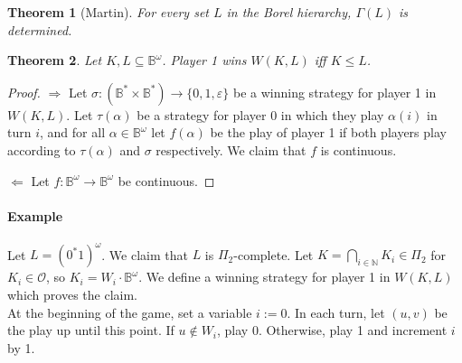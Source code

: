 \documentclass{article}
\newtheorem{theorem}{Theorem}
\begin{document}
\begin{theorem}[Martin]
	For every set $L$ in the Borel hierarchy, $\Gamma(L)$ is determined.
\end{theorem} 

\begin{theorem}
	Let $K, L \subseteq \mathbb{B}^\omega$. Player 1 wins $W(K, L)$ iff $K \leq L$.
\end{theorem}
\begin{proof}
	$\boldsymbol{\Rightarrow}$ Let $\sigma : (\mathbb{B}^* \times \mathbb{B}^*) \rightarrow \{0, 1, \varepsilon\}$ be a winning strategy for player 1 in $W(K, L)$. Let $\tau(\alpha)$ be a strategy for player 0 in which they play $\alpha(i)$ in turn $i$, and for all $\alpha \in \mathbb{B}^\omega$ let $f(\alpha)$ be the play of player 1 if both players play according to $\tau(\alpha)$ and $\sigma$ respectively. We claim that $f$ is continuous. %
	
	$\boldsymbol{\Leftarrow}$ Let $f : \mathbb{B}^\omega \rightarrow \mathbb{B}^\omega$ be continuous. %
\end{proof}

\paragraph{Example} Let $L = (0^*1)^\omega$. We claim that $L$ is $\Pi_2$-complete. Let $K = \bigcap\limits_{i \in \mathbb{N}} K_i \in \Pi_2$ for $K_i \in \mathcal{O}$, so $K_i = W_i \cdot \mathbb{B}^\omega$. We define a winning strategy for player 1 in $W(K, L)$ which proves the claim. \\
	At the beginning of the game, set a variable $i := 0$. In each turn, let $(u, v)$ be the play up until this point. If $u \notin W_i$, play 0. Otherwise, play 1 and increment $i$ by 1.
	
\end{document}
